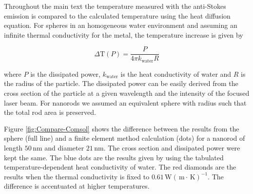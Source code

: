 \documentclass[journal=nalefd,manuscript=letter]{achemso}
\newcommand{\K}{\ensuremath{\,\textrm{K}}}
\newcommand{\nm}{\ensuremath{\,\textrm{nm}}}
\newcommand{\m}{\ensuremath{\,\textrm{m}}}
\newcommand{\W}{\ensuremath{\,\textrm{W}}}
\begin{document}
Throughout the main text the temperature measured with the anti-Stokes emission
is compared to the calculated temperature using the heat diffusion
equation. For spheres in an homogeneous water environment and assuming an infinite
thermal conductivity for the metal, the temperature increase is given by

\begin{equation}
	\Delta \textrm{T}(P) = \frac{P}{4\pi k_{\textrm{water}} R}
\end{equation}

\noindent where $P$ is the dissipated power, $k_{\textrm{water}}$ is the heat
conductivity of water and $R$ is the radius of the particle.\cite{Baffou2013} 
The dissipated power can be
easily derived from the cross section of the particle at a given wavelength and
the intensity of the focused laser beam. For nanorods we assumed an
equivalent sphere with radius such that the total rod area is preserved.

Figure \ref{fig:Compare-Comsol} shows the difference between the results from
the sphere (full line) and a finite element method calculation
(dots) for a nanorod of length $50\nm$ and diameter $21\nm$. The cross section
and dissipated power were kept the same. The blue dots are the results given
by using the tabulated temperature-dependent heat conductivity of water. 
The red diamonds are the results when the thermal
conductivity is fixed to $0.61 \W(\m\cdot\K)^{-1}$. The difference is
accentuated at higher temperatures.


 
\end{document}
